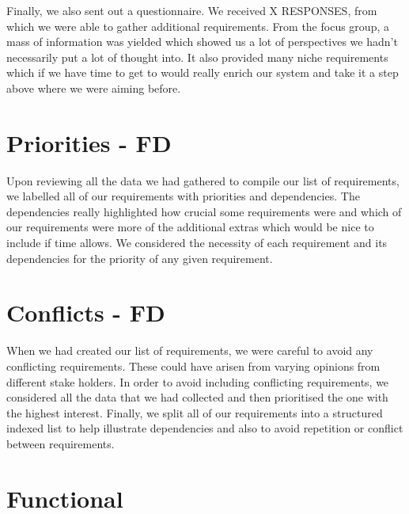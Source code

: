 \documentclass[11pt]{report}
\begin{document}
Finally, we also sent out a questionnaire. We received X RESPONSES, from which we were able to gather additional requirements. From the focus group, a mass of information was yielded which showed us a lot of perspectives we hadn’t necessarily put a lot of thought into. It also provided many niche requirements which if we have time to get to would really enrich our system and take it a step above where we were aiming before.

\section{Priorities - FD}

Upon reviewing all the data we had gathered to compile our list of requirements, we labelled all of our requirements with priorities and dependencies. The dependencies really highlighted how crucial some requirements were and which of our requirements were more of the additional extras which would be nice to include if time allows. We considered the necessity of each requirement and its dependencies for the priority of any given requirement.

\section{Conflicts - FD}

When we had created our list of requirements, we were careful to avoid any conflicting requirements. These could have arisen from varying opinions from different stake holders. In order to avoid including conflicting requirements, we considered all the data that we had collected and then prioritised the one with the highest interest. Finally, we split all of our requirements into a structured indexed list to help illustrate dependencies and also to avoid repetition or conflict between requirements.

\section{Functional}
\end{document}
